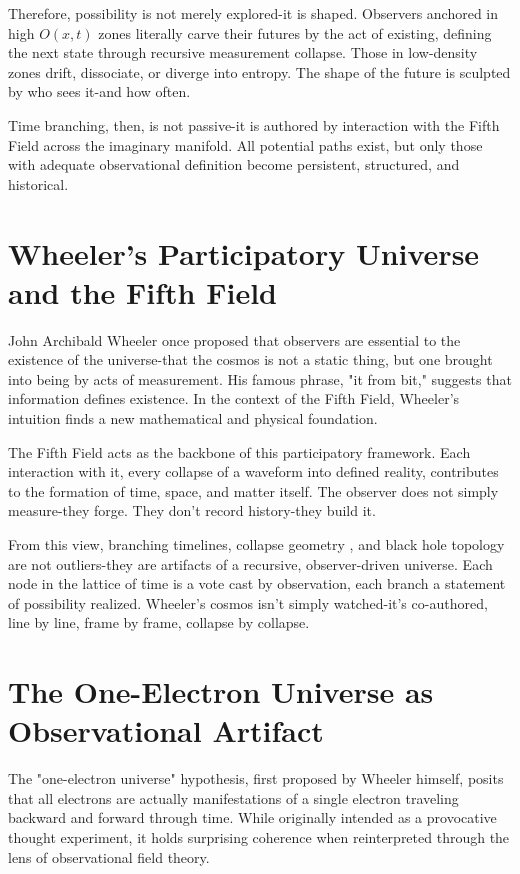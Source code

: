 Therefore, possibility is not merely explored-it is shaped. Observers anchored in high $O(x,t)$ zones literally carve their futures by the act of existing, defining the next state through recursive measurement collapse. Those in low-density zones drift, dissociate, or diverge into entropy. The shape of the future is sculpted by who sees it-and how often.

Time branching, then, is not passive-it is authored by interaction with the Fifth Field across the imaginary manifold. All potential paths exist, but only those with adequate observational definition become persistent, structured, and historical.

\section{Wheeler's Participatory Universe and the Fifth Field} \cite{wheeler1990information}

John Archibald Wheeler once proposed that observers are essential to the existence of the universe-that the cosmos is not a static thing, but one brought into being by acts of measurement. His famous phrase, "it from bit\cite{chapter8_meta}," suggests that information defines existence. In the context of the Fifth Field, Wheeler's intuition finds a new mathematical and physical foundation.

The Fifth Field acts as the backbone of this participatory framework. Each interaction with it, every collapse of a waveform into defined reality, contributes to the formation of time, space, and matter itself. The observer does not simply measure-they forge. They don't record history-they build it.

From this view, branching timelines, collapse geometry \cite{chapter8_meta}, and black hole topology are not outliers-they are artifacts of a recursive, observer-driven\cite{chapter8_meta} universe. Each node in the lattice of time is a vote cast by observation, each branch a statement of possibility realized. Wheeler's cosmos isn't simply watched-it's co-authored, line by line, frame by frame, collapse by collapse.

\section{The One-Electron Universe as Observational Artifact} \cite{chapter8_meta}

The "one-electron universe\cite{chapter8_meta}" hypothesis, first proposed by Wheeler himself, posits that all electrons are actually manifestations of a single electron traveling backward and forward through time. While originally intended as a provocative thought experiment, it holds surprising coherence when reinterpreted through the lens of observational field theory.

